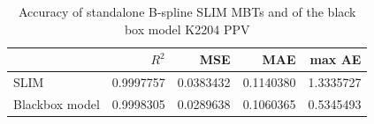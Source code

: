 \begin{table}[!htb]

\centering \scriptsize
\begin{tabular}[t]{l|r|r|r|r}
\hline
  & $R^2$ & MSE & MAE & max AE \\
\hline
SLIM & 0.9997757 & 0.0383432 & 0.1140380 & 1.3335727\\
Blackbox model & 0.9998305 & 0.0289638 & 0.1060365 & 0.5345493\\
\hline
\end{tabular}
\label{tab:ins_k2204_ppv_standalone_slim}
\caption{Accuracy of standalone B-spline SLIM MBTs and of the black box model K2204 PPV}
\end{table}







